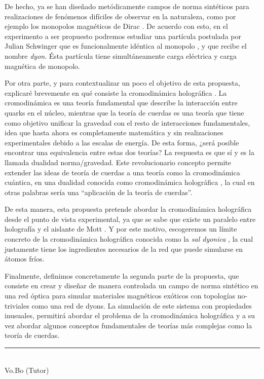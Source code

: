 \documentclass[superscriptaddress,onecolumn,aps,preprint,showpacs,nofootinbib,pra,11pt]{revtex4-2}
\begin{document}
\begin{normalsize}
De hecho, ya se han diseñado metódicamente campos de norma sintéticos para realizaciones de fenómenos difíciles de observar en la naturaleza, como por ejemplo los monopolos magnéticos de Dirac \cite{Ray-nature505}. De acuerdo con esto, en el experimento a ser propuesto podremos estudiar una partícula postulada por Julian Schwinger que es funcionalmente idéntica al monopolo \cite{Schwinger-science165}, y que recibe el nombre \textit{dyon}. Ésta partícula tiene simultáneamente carga eléctrica y carga magnética de monopolo. \medskip

Por otra parte, y para contextualizar un poco el objetivo de esta propuesta, explicaré brevemente en qué consiste la cromodinámica holográfica \cite{Erlich-prl95}. La cromodinámica es una teoría fundamental que describe la interacción entre quarks en el núcleo, mientras que la teoría de cuerdas es una teoría que tiene como objetivo unificar la gravedad con el resto de interacciones fundamentales, idea que hasta ahora es completamente matemática y sin realizaciones experimentales debido a las escalas de energía. De esta forma, ¿será posible encontrar una equivalencia entre estas dos teorías? La respuesta es que sí y es la llamada dualidad norma/gravedad. Este revolucionario concepto permite extender las ideas de teoría de cuerdas a una teoría como la cromodinámica cuántica, en una dualidad conocida como cromodinámica holográfica \cite{Erlich-prl95}, la cual en otras palabras sería una ``aplicación de la teoría de cuerdas''. \medskip

De esta manera, esta propuesta pretende abordar la cromodinámica holográfica desde el punto de vista experimental, ya que se sabe que existe un paralelo entre holografía y el aislante de Mott \cite{Edalati-prl106, Baggioli-arXiv160408915}. Y por este motivo, escogeremos un límite concreto de la cromodinámica holográfica conocida como la \textit{sal dyonica} \cite{Rho-jhep689}, la cual justamente tiene los ingredientes necesarios de la red que puede simularse en \'atomos fr\'ios.\medskip

Finalmente, definimos concretamente la segunda parte de la propuesta, que consiste en crear y diseñar de manera controlada un campo de norma sintético en una red óptica para simular materiales magnéticos exóticos con topologías no-triviales como una red de dyons. La simulación de este sistema con propiedades inusuales, permitirá abordar el problema de la cromodinámica holográfica y a su vez abordar algunos conceptos fundamentales de teorías más complejas como la teoría de cuerdas.\medskip

\end{normalsize}
\vspace{2cm}
\begin{center}
 \rule{8cm}{0.1mm}
\\Vo.Bo (Tutor)
\end{center}




 
\end{document}
